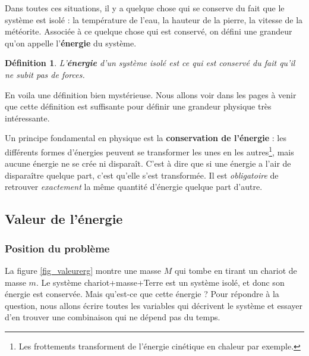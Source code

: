 \documentclass[a4paper,12pt]{book}
\newcounter{numtho}
\theoremstyle{mes_exemples}	\newtheorem{exemple}[numtho]{Exemple}
\theoremstyle{mes_tho}
\newtheorem{definition}[numtho]{Définition}
\newcommand{\defe}[2]{\textbf{#1}\index{#2}}
\begin{document}
Dans toutes ces situations, il y a quelque chose qui se conserve du fait que le système est isolé : la température de l'eau, la hauteur de la pierre, la vitesse de la météorite. Associée à ce quelque chose qui est conservé, on défini une grandeur qu'on appelle l'\defe{énergie}{Énergie} du système.

\begin{definition}
 L'\defe{énergie}{} d'un système isolé est ce qui est conservé du fait qu'il ne subit pas de forces.
\end{definition}
En voila une définition bien mystérieuse. Nous allons voir dans les pages à venir que cette définition est suffisante pour définir une grandeur physique très intéressante.

Un principe fondamental en physique est la {\bf conservation de l'énergie} : les différents formes d'énergies peuvent se transformer les unes en les autres\footnote{Les frottements transforment de l'énergie cinétique en chaleur par exemple.}, mais aucune énergie ne se crée ni disparaît. C'est à dire que si une énergie a l'air de disparaître quelque part, c'est qu'elle s'est transformée. Il est \emph{obligatoire} de retrouver \emph{exactement} la même quantité d'énergie quelque part d'autre.

\subsection{Valeur de l'énergie}

\subsubsection{Position du problème}

La figure \ref{fig_valeurerg} montre une masse $M$ qui tombe en tirant un chariot de masse $m$. Le système chariot+masse+Terre est un système isolé, et donc son énergie est conservée. Mais qu'est-ce que cette énergie ? Pour répondre à la question, nous allons écrire toutes les variables qui décrivent le système et essayer d'en trouver une combinaison qui ne dépend pas du temps.
\end{document}
